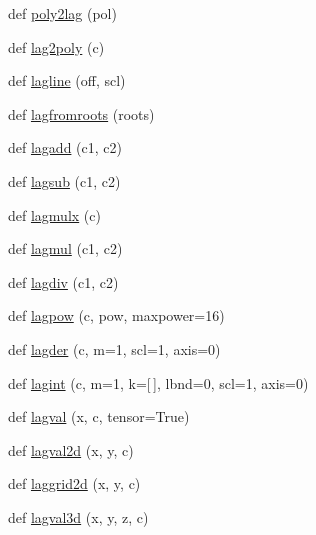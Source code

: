 \begin{DoxyCompactItemize}
\item 
def \hyperlink{namespacenumpy_1_1polynomial_1_1laguerre_a8ce4a89a642f9ce56be2c658e09a4f5d}{poly2lag} (pol)
\item 
def \hyperlink{namespacenumpy_1_1polynomial_1_1laguerre_acb0d8bfcf3de2bf3fbe7d5a17f151534}{lag2poly} (c)
\item 
def \hyperlink{namespacenumpy_1_1polynomial_1_1laguerre_a49a8393e11ea9e2d688b6958a42020de}{lagline} (off, scl)
\item 
def \hyperlink{namespacenumpy_1_1polynomial_1_1laguerre_a7fc895fe50b6da14a9a9972b880271ca}{lagfromroots} (roots)
\item 
def \hyperlink{namespacenumpy_1_1polynomial_1_1laguerre_af98318d9266d2cedd1c3cb46e8041f27}{lagadd} (c1, c2)
\item 
def \hyperlink{namespacenumpy_1_1polynomial_1_1laguerre_aaa7ba7b9c5949327368bb985fcecad1c}{lagsub} (c1, c2)
\item 
def \hyperlink{namespacenumpy_1_1polynomial_1_1laguerre_a8d62d0519894c9382e106791df329620}{lagmulx} (c)
\item 
def \hyperlink{namespacenumpy_1_1polynomial_1_1laguerre_a50d351bd87e0cc8e48683201b8e50bf6}{lagmul} (c1, c2)
\item 
def \hyperlink{namespacenumpy_1_1polynomial_1_1laguerre_ab63c671d9776cb4e536aae3a32bc022b}{lagdiv} (c1, c2)
\item 
def \hyperlink{namespacenumpy_1_1polynomial_1_1laguerre_aa17d8c1abad13989af8c7670531f8081}{lagpow} (c, pow, maxpower=16)
\item 
def \hyperlink{namespacenumpy_1_1polynomial_1_1laguerre_ac6411a31d45519fa3f544b39781665ee}{lagder} (c, m=1, scl=1, axis=0)
\item 
def \hyperlink{namespacenumpy_1_1polynomial_1_1laguerre_a51b52ca92eaa29ce35e3344e5a3254c6}{lagint} (c, m=1, k=\mbox{[}$\,$\mbox{]}, lbnd=0, scl=1, axis=0)
\item 
def \hyperlink{namespacenumpy_1_1polynomial_1_1laguerre_ae0391215cc88c31e22aa27485d51f5f4}{lagval} (x, c, tensor=True)
\item 
def \hyperlink{namespacenumpy_1_1polynomial_1_1laguerre_ac004cc6f654a080a1b08c6fa63452bc1}{lagval2d} (x, y, c)
\item 
def \hyperlink{namespacenumpy_1_1polynomial_1_1laguerre_aa1e2a402a9654a8ee372c7a9ab7191aa}{laggrid2d} (x, y, c)
\item 
def \hyperlink{namespacenumpy_1_1polynomial_1_1laguerre_add65fabd72f37217cedda99a89d96434}{lagval3d} (x, y, z, c)

\end{DoxyCompactItemize}
